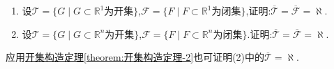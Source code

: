 \documentclass[../../main.tex]{subfiles}%
\begin{document}
\begin{proposition}\label{proposition:Rn上的所有开闭集的势}
\begin{enumerate}[(1)]
\item 设$\mathscr{T}=\{G\mid G\subset\mathbb{R}^1$为开集$\}$,$\mathscr{F}=\{F\mid F\subset\mathbb{R}^1$为闭集$\}$,证明:$\overline{\mathscr{T}}=\overline{\mathscr{F}}=\aleph$.

\item 设$\mathscr{T}=\{G\mid G\subset\mathbb{R}^n$为开集$\}$,$\mathscr{F}=\{F\mid F\subset\mathbb{R}^n$为闭集$\}$.证明:$\overline{\mathscr{T}}=\overline{\mathscr{F}}=\aleph$.
\end{enumerate}
\end{proposition}
\begin{remark}
应用\hyperref[theorem:开集构造定理-2]{开集构造定理\ref{theorem:开集构造定理-2}}也可证明(2)中的$\overline{\mathscr{T}}=\aleph$.
\end{remark}
\end{document}
